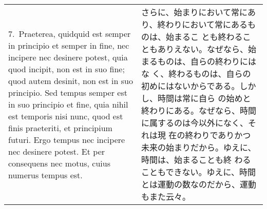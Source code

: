 \documentclass[10pt]{jsarticle} %
\begin{document}
%
%
%


\begin{longtable}{p{21em}p{21em}}

7.~{\sc Praeterea}, quidquid est semper in principio et semper in fine, nec
 incipere nec desinere potest, quia quod incipit, non est in suo fine;
 quod autem desinit, non est in suo principio. Sed tempus semper est in
 suo principio et fine, quia nihil est temporis nisi nunc, quod est
 finis praeteriti, et principium futuri. Ergo tempus nec incipere nec
 desinere potest. Et per consequens nec motus, cuius numerus tempus est.

&

さらに、始まりにおいて常にあり、終わりにおいて常にあるものは、始まるこ
とも終わることもありえない。なぜなら、始まるものは、自らの終わりにはな
く、終わるものは、自らの初めにはないからである。しかし、時間は常に自ら
の始めと終わりにある。なぜなら、時間に属するのは今以外になく、それは現
在の終わりでありかつ未来の始まりだから。ゆえに、時間は、始まることも終
わることもできない。ゆえに、時間とは運動の数なのだから、運動もまた云々。

\end{longtable}
%
%
%
%
\end{document}
